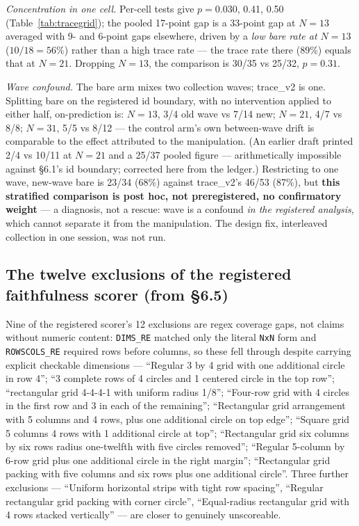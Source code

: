\emph{Concentration in one cell.} Per-cell tests give $p = 0.030$, 0.41, 0.50
(Table~\ref{tab:tracegrid}); the pooled 17-point gap is a 33-point gap at $N = 13$ averaged with 9-
and 6-point gaps elsewhere, driven by a \emph{low bare rate at $N = 13$} ($10/18 = 56\%$) rather than
a high trace rate --- the trace rate there (89\%) equals that at $N = 21$. Dropping $N = 13$, the
comparison is 30/35 vs 25/32, $p = 0.31$.

\emph{Wave confound.} The bare arm mixes two collection waves; trace\_v2 is one. Splitting bare on the
registered id boundary, with no intervention applied to either half, on-prediction is: $N = 13$, 3/4
old wave vs 7/14 new; $N = 21$, 4/7 vs 8/8; $N = 31$, 5/5 vs 8/12 --- the control arm's own
between-wave drift is comparable to the effect attributed to the manipulation. (An earlier
draft printed 2/4 vs 10/11 at $N = 21$ and a 25/37 pooled figure --- arithmetically impossible
against \S6.1's id boundary; corrected here from the ledger.) Restricting to one
wave, new-wave bare is 23/34 (68\%) against trace\_v2's 46/53 (87\%), but \textbf{this stratified
comparison is post hoc, not preregistered, no confirmatory weight} --- a diagnosis, not a rescue:
wave is a confound \emph{in the registered analysis}, which cannot separate it from the manipulation.
The design fix, interleaved collection in one session, was not run.

\subsection{The twelve exclusions of the registered faithfulness scorer (from \S6.5)}

Nine of the registered scorer's 12 exclusions are regex
coverage gaps, not claims without numeric content: \texttt{DIMS\_RE} matched only the
literal \texttt{NxN} form and \texttt{ROWSCOLS\_RE} required rows before columns, so these fell through despite
carrying explicit checkable dimensions --- ``Regular 3 by 4 grid with one additional circle in row
4''; ``3 complete rows of 4 circles and 1 centered circle in the top row''; ``rectangular grid 4-4-4-1
with uniform radius 1/8''; ``Four-row grid with 4 circles in the first row and 3 in each of the
remaining''; ``Rectangular grid arrangement with 5 columns and 4 rows, plus one additional circle on
top edge''; ``Square grid 5 columns 4 rows with 1 additional circle at top''; ``Rectangular grid six
columns by six rows radius one-twelfth with five circles removed''; ``Regular 5-column by 6-row grid
plus one additional circle in the right margin''; ``Rectangular grid packing with five columns and
six rows plus one additional circle''. Three further exclusions --- ``Uniform horizontal strips with
tight row spacing'', ``Regular rectangular grid packing with corner circle'', ``Equal-radius
rectangular grid with 4 rows stacked vertically'' --- are closer to genuinely unscoreable.

